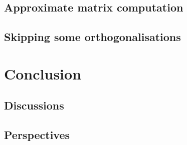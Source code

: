\documentclass[]{article}
\begin{document}
\subsection{Approximate matrix computation}


\subsection{Skipping some orthogonalisations}


\section{Conclusion}

\subsection{Discussions}


\subsection{Perspectives}


\printbibliography
\end{document}
